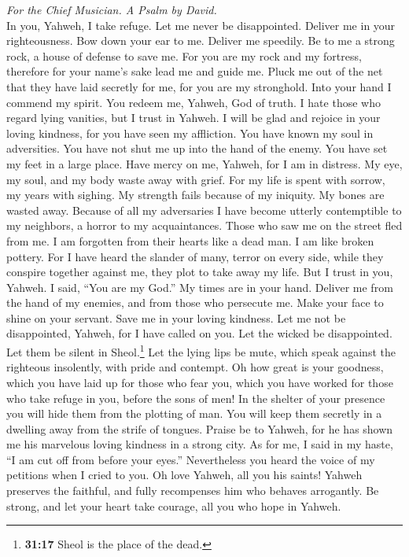 \emph{For the Chief Musician. A Psalm by David.}\\
 In you, Yahweh, I take refuge. Let me never be
disappointed. Deliver me in your righteousness.  Bow down
your ear to me. Deliver me speedily. Be to me a strong rock, a house of
defense to save me.  For you are my rock and my fortress,
therefore for your name's sake lead me and guide me. 
Pluck me out of the net that they have laid secretly for me, for you are
my stronghold.  Into your hand I commend my spirit. You
redeem me, Yahweh, God of truth.  I hate those who regard
lying vanities, but I trust in Yahweh.  I will be glad and
rejoice in your loving kindness, for you have seen my affliction. You
have known my soul in adversities.  You have not shut me
up into the hand of the enemy. You have set my feet in a large place.
 Have mercy on me, Yahweh, for I am in distress. My eye,
my soul, and my body waste away with grief.  For my life
is spent with sorrow, my years with sighing. My strength fails because
of my iniquity. My bones are wasted away.  Because of all
my adversaries I have become utterly contemptible to my neighbors, a
horror to my acquaintances. Those who saw me on the street fled from me.
 I am forgotten from their hearts like a dead man. I am
like broken pottery.  For I have heard the slander of
many, terror on every side, while they conspire together against me,
they plot to take away my life.  But I trust in you,
Yahweh. I said, ``You are my God.''  My times are in your
hand. Deliver me from the hand of my enemies, and from those who
persecute me.  Make your face to shine on your servant.
Save me in your loving kindness.  Let me not be
disappointed, Yahweh, for I have called on you. Let the wicked be
disappointed. Let them be silent in Sheol.\footnote{\textbf{31:17} Sheol
  is the place of the dead.}  Let the lying lips be mute,
which speak against the righteous insolently, with pride and contempt.
 Oh how great is your goodness, which you have laid up
for those who fear you, which you have worked for those who take refuge
in you, before the sons of men!  In the shelter of your
presence you will hide them from the plotting of man. You will keep them
secretly in a dwelling away from the strife of tongues. 
Praise be to Yahweh, for he has shown me his marvelous loving kindness
in a strong city.  As for me, I said in my haste, ``I am
cut off from before your eyes.'' Nevertheless you heard the voice of my
petitions when I cried to you.  Oh love Yahweh, all you
his saints! Yahweh preserves the faithful, and fully recompenses him who
behaves arrogantly.  Be strong, and let your heart take
courage, all you who hope in Yahweh.

